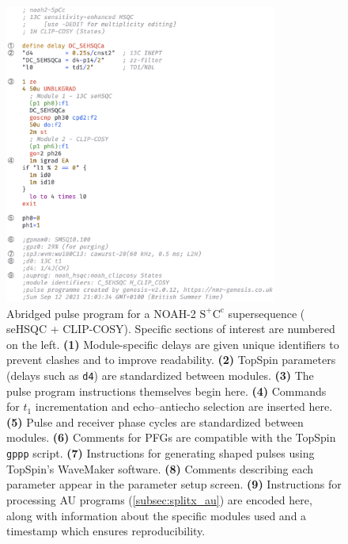\documentclass[a4paper,11pt]{article}
\newcommand{\carbon}{\ch{^{13}C}}
\begin{document}
\begin{refsection}
\begin{figure}
    \centering
    \includegraphics[width=0.8\textwidth]{pulprog_code.png}
    \caption{
        Abridged pulse program for a NOAH-2 \(\mathrm{S^+C^c}\) supersequence (\carbon{} seHSQC + CLIP-COSY).
        Specific sections of interest are numbered on the left.
        \textbf{(1)} Module-specific delays are given unique identifiers to prevent clashes and to improve readability.
        \textbf{(2)} TopSpin parameters (delays such as \texttt{d4}) are standardized between modules.
        \textbf{(3)} The pulse program instructions themselves begin here.
        \textbf{(4)} Commands for \(t_1\) incrementation and echo--antiecho selection are inserted here.
        \textbf{(5)} Pulse and receiver phase cycles are standardized between modules.
        \textbf{(6)} Comments for PFGs are compatible with the TopSpin \texttt{gppp} script.
        \textbf{(7)} Instructions for generating shaped pulses using TopSpin's WaveMaker software.
        \textbf{(8)} Comments describing each parameter appear in the parameter setup screen.
        \textbf{(9)} Instructions for processing AU programs (\cref{subsec:splitx_au}) are encoded here, along with information about the specific modules used and a timestamp which ensures reproducibility.
    }
    \label{fig:pulprog_code}
\end{figure}


\end{refsection}
\end{document}
